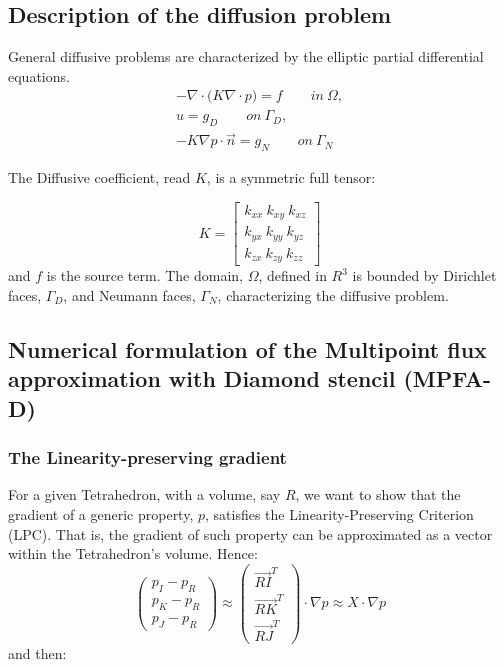\documentclass{article}
\begin{document}
	\subsection{Description of the diffusion problem}

General diffusive problems are characterized by the elliptic partial differential equations.
\begin{equation}
\begin{split}
- \nabla \cdot \big( K \nabla \cdot p \big) = f  \qquad in\ \Omega, \\
u = g_{D} \qquad on\ \Gamma_{D}, \\
- K \nabla p \cdot \vec{n} = g_{N} \qquad on\ \Gamma_{N}
\end{split}
\end{equation}
	
	The Diffusive coefficient, read $K$, is a symmetric full tensor:

\begin{equation}
K = \begin{bmatrix}
	k_{xx} \ k_{xy} \ k_{xz} \\
	k_{yx} \ k_{yy} \ k_{yz} \\
	k_{zx} \ k_{zy} \ k_{zz} 
\end{bmatrix}
\end{equation}
and $f$ is the source term. The domain, $\Omega$, defined in $R^3$ is bounded by Dirichlet faces, $\Gamma_{D}$, and Neumann faces, $\Gamma_{N}$, characterizing the diffusive problem.
	
	\subsection{Numerical formulation of the Multipoint flux approximation with Diamond stencil (MPFA-D)}
	
		\subsubsection{The Linearity-preserving gradient}
For a given Tetrahedron, with a volume, say $R$, we want to show that the gradient of a generic property, $p$, satisfies the Linearity-Preserving Criterion (LPC). That is, the gradient of such property can be approximated as a vector within the Tetrahedron's volume. Hence:
	\begin{equation} \label{eq:e1}											
		\begin{pmatrix}
				p_{I} - p_{R} \\ p_{K} - p_{R}  \\ p_{J} - p_{R}
			\end{pmatrix}
		\approx
		\begin{pmatrix}
			\vec{RI}^{T} \\ \vec{RK}^{T} \\ \vec{RJ}^{T}
		\end{pmatrix}\cdot \nabla p \approx X \cdot \nabla p		
	\end{equation}
	and then:
\end{document}
